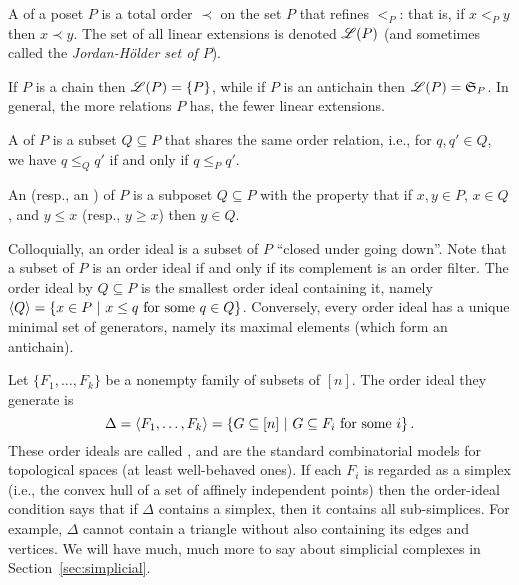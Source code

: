 \begin{definition}
A  of a poset $P$ is a total order $\prec$ on the set $P$ that refines $<_P$: that is, if $x<_Py$ then $x\prec y$.  The set of all linear extensions is denoted $\mathscr{L}(P)$ (and sometimes called the \emph{Jordan-H\"{o}lder set of $P$}).
\end{definition}

If $P$ is a chain then $\mathscr{L}(P)=\{P\}$, while if $P$ is an antichain then $\mathscr{L}(P)=\mathfrak{S}_P$.  In general, the more relations $P$ has, the fewer linear extensions. %

\begin{definition}
A  of $P$ is a subset  $Q\subseteq P$ that shares the same order relation, i.e., for $q,q'\in Q$, we have $q\leq_Qq'$ if and only if $q\leq_Pq'$.
\end{definition}

\begin{definition} \label{def:order-ideal}
An  (resp., an ) of $P$ is a subposet $Q\subseteq P$ with the property that if $x,y\in P$, $x\in Q$, and $y\leq x$ (resp., $y\geq x$) then $y\in Q$.
\end{definition}

Colloquially, an order ideal is a subset of $P$ ``closed under going down''.  Note that a subset of $P$ is an order ideal if and only if its complement is an order filter.  The order ideal  by $Q\subseteq P$ is the smallest order ideal containing it, namely $\langle Q\rangle=\{x\in P ~|~ x\leq q\text{ for some } q\in Q\}$.  Conversely, every order ideal has a unique minimal set of generators, namely its maximal elements (which form an antichain).

\begin{example}
Let $\{F_1,\dots,F_k\}$ be a nonempty family of subsets of $[n]$.  The order ideal they generate is
\[\Delta=\langle F_1,\dots, F_k\rangle = \left\{G\subseteq[n] ~|~ G\subseteq F_i \text{ for some }i\right\}.\]
These order ideals are called , and are the standard combinatorial models for topological spaces (at least well-behaved ones).  If each $F_i$ is regarded as a simplex (i.e., the convex hull of a set of affinely independent points) then the order-ideal condition says that if $\Delta$ contains a simplex, then it contains all sub-simplices.  For example, $\Delta$ cannot contain a triangle without also containing its edges and vertices.  We will have much, much more to say about simplicial complexes in Section~\ref{sec:simplicial}.
\end{example}

